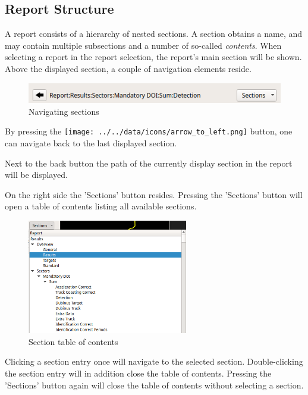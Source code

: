 \subsection{Report Structure}

A report consists of a hierarchy of nested sections. 
A section obtains a name, and may contain multiple subsections and a number of so-called \textit{contents}.
When selecting a report in the report selection, the report's main section will be shown. \\

Above the displayed section, a couple of navigation elements reside.

\begin{figure}[H]
    \hspace*{-2.5cm}
    \center
    \includegraphics[width=12cm,frame]{figures/navigation.png}
  \caption{Navigating sections}
\end{figure}

By pressing the \texttt{[image: ../../data/icons/arrow\_to\_left.png]} button,
one can navigate back to the last displayed section.

Next to the back button the path of the currently display section in the report will be displayed.

On the right side the 'Sections' button resides. Pressing the 'Sections' button will open a table of 
contents listing all available sections.

\begin{figure}[H]
    \hspace*{-2.5cm}
    \center
    \includegraphics[width=7cm,frame]{figures/section_button.png}
  \caption{Section table of contents}
\end{figure}

Clicking a section entry once will navigate to the selected section. Double-clicking the section entry will 
in addition close the table of contents. Pressing the 'Sections' button again will close the table of contents
without selecting a section. \\

